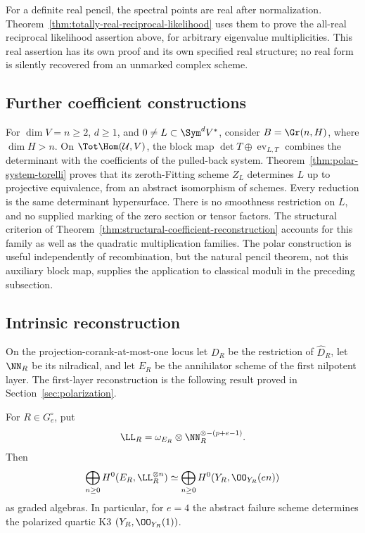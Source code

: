 For a definite real pencil, the spectral points are real after
normalization.  Theorem~\ref{thm:totally-real-reciprocal-likelihood}
uses them to prove the all-real reciprocal likelihood assertion above,
for arbitrary eigenvalue multiplicities.  This real assertion has
its own proof and its own specified real structure; no real form is
silently recovered from an unmarked complex scheme.

\subsection{Further coefficient constructions}

For \(\dim V=n\ge2\), \(d\ge1\), and
\(0\ne L\subset\Sym^dV^*\), consider \(B=\Gr(n,H)\),
where \(\dim H>n\).  On \(\Tot\Hom(\mathcal U,V)\), the
block map \(\det T\oplus\operatorname{ev}_{L,T}\) combines
the determinant with the coefficients of the pulled-back system.
Theorem~\ref{thm:polar-system-torelli} proves that its zeroth-Fitting
scheme \(Z_L\) determines \(L\) up to projective equivalence,
from an abstract isomorphism of schemes.  Every reduction is the same
determinant hypersurface.  There is no smoothness restriction on
\(L\), and no supplied marking of the zero section or tensor factors.
The structural criterion of
Theorem~\ref{thm:structural-coefficient-reconstruction} accounts for
this family as well as the quadratic multiplication families.
The polar construction is useful independently of recombination, but
the natural pencil theorem, not this auxiliary block map, supplies
the application to classical moduli in the preceding subsection.

\subsection{Intrinsic reconstruction}

On the projection-corank-at-most-one locus let \(D_R\) be the
restriction of \(\widehat D_R\), let \(\NN_R\) be its
nilradical, and let \(E_R\) be the annihilator scheme of the first
nilpotent layer.  The first-layer reconstruction is the following result
proved in Section~\ref{sec:polarization}.

\begin{theorem}
\label{thm:main-reconstruction}
For \(R\in G_e^\circ\), put
\[
 \LL_R=\omega_{E_R}\otimes
 \NN_R^{\otimes-(p+e-1)}.
\]
Then
\[
 \bigoplus_{n\ge0}H^0(E_R,\LL_R^{\otimes n})
 \simeq
 \bigoplus_{n\ge0}H^0(Y_R,\OO_{Y_R}(en))
\]
as graded algebras.  In particular, for \(e=4\) the abstract
failure scheme determines the polarized quartic K3
\((Y_R,\OO_{Y_R}(1))\).
\end{theorem}


